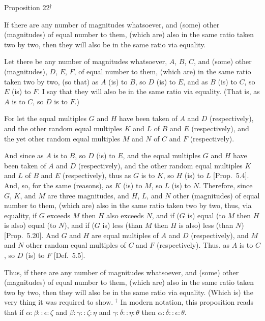
\begin{center}
{\large Proposition 22}$^\dag$
\end{center}

If there are any number of magnitudes
whatsoever, and (some) other (magnitudes)  of equal  number to them, (which are)
also in the same ratio taken two by two, then they will also be in the
same ratio via equality.

\epsfysize=0.58in
\centerline{}

Let there be any number of magnitudes whatsoever, $A$, $B$,  $C$, and
(some) other (magnitudes), $D$, $E$, $F$, of equal number to them, (which are)
in the same ratio taken two by two, (so that) as $A$ (is) to $B$, so
$D$ (is) to $E$, and as $B$ (is) to $C$, so $E$ (is) to $F$. I say that they
will also be in the same ratio via equality. (That is, as $A$ is to $C$, so
$D$ is to $F$.)

For let the equal multiples $G$ and $H$ have been taken of $A$ and $D$ (respectively), and the other random equal multiples $K$ and $L$ of $B$ and
$E$ (respectively), and the yet other random equal multiples $M$ and $N$ of
$C$ and $F$ (respectively).

And since as $A$ is to $B$, so $D$ (is) to $E$, and the equal multiples $G$ and $H$
have been taken of $A$ and $D$ (respectively), and the other random
equal multiples $K$ and $L$ of $B$ and $E$ (respectively), thus as $G$ is to $K$,
so $H$ (is) to $L$ [Prop.~5.4]. And, so, for the same
(reasons), as $K$ (is) to $M$, so $L$ (is) to $N$. Therefore, since $G$, $K$, and $M$ are three magnitudes, and $H$, $L$, and $N$ other (magnitudes) of equal number to them,
(which are) also in the same ratio taken two by two, thus, via equality,
if $G$ exceeds $M$ then $H$ also exceeds $N$, and if ($G$ is) equal (to $M$ then $H$
is also) equal (to $N$), and if ($G$ is) less (than $M$ then $H$
is also) less (than $N$) [Prop.~5.20].
And  $G$ and $H$ are equal multiples of $A$ and $D$ (respectively),
and $M$ and $N$ other random equal multiples of $C$ and $F$ (respectively).
Thus, as $A$ is to $C$, so $D$ (is) to $F$ [Def.~5.5].

Thus, if there are any number of magnitudes
whatsoever, and (some) other (magnitudes) of equal number to them, (which are)
also in the same ratio taken two by two, then they will also be in the
same ratio via equality. (Which is) the very thing
it was required to show.
{\footnotesize \noindent $^\dag$ In modern notation, this proposition
reads that if $\alpha:\beta::\epsilon:\zeta$ and $\beta:\gamma::\zeta:\eta$ 
and $\gamma:\delta::\eta:\theta$ 
then $\alpha:\delta::\epsilon:\theta$.}

